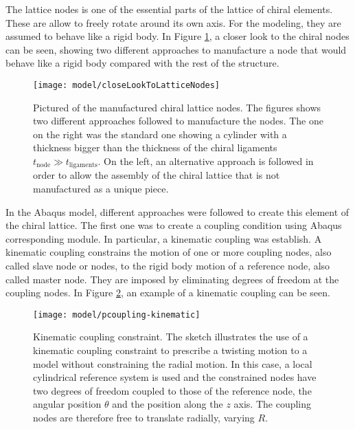     The lattice nodes is one of the essential parts of the lattice of chiral elements. These are allow to freely rotate around its own axis. For the modeling, they are assumed to behave like a rigid body. In Figure \ref{fig:closeLookToLatticeNodes}, a closer look to the chiral nodes can be seen, showing two different approaches to manufacture a node that would behave like a rigid body compared with the rest of the structure.

    \begin{figure}[!htpb]
      \centering
      \texttt{[image: model/closeLookToLatticeNodes]}
      \caption[Pictured of the manufactured chiral lattice nodes]{Pictured of the manufactured chiral lattice nodes. The figures shows two different approaches followed to manufacture the nodes. The one on the right was the standard one showing a cylinder with a thickness bigger than the thickness of the chiral ligaments $t_{\mathrm{node}} \gg t_{\mathrm{ligaments}}$. On the left, an alternative approach is followed in order to allow the assembly of the chiral lattice that is not manufactured as a unique piece. \cite{Vincenz2017}}\label{fig:closeLookToLatticeNodes}
    \end{figure}

    In the Abaqus model, different approaches were followed to create this element of the chiral lattice. The first one was to create a coupling condition using Abaqus corresponding module. In particular, a kinematic coupling was establish. A kinematic coupling constrains the motion of one or more coupling nodes, also called slave node or nodes, to the rigid body motion of a reference node, also called master node. They are imposed by eliminating degrees of freedom at the coupling nodes. In Figure \ref{fig:kinematicCoupling}, an example of a kinematic coupling can be seen.

    \begin{figure}[!htpb]
      \centering
      \texttt{[image: model/pcoupling-kinematic]}
      \caption[Kinematic coupling constraint]{Kinematic coupling constraint. The sketch illustrates the use of a kinematic coupling constraint to prescribe a twisting motion to a model without constraining the radial motion. In this case, a local cylindrical reference system is used and the constrained nodes have two degrees of freedom coupled to those of the reference node, the angular position $\theta$ and the position along the $z$ axis. The coupling nodes are therefore free to translate radially, varying $R$. \cite{Abaqus}}\label{fig:kinematicCoupling}
    \end{figure}


